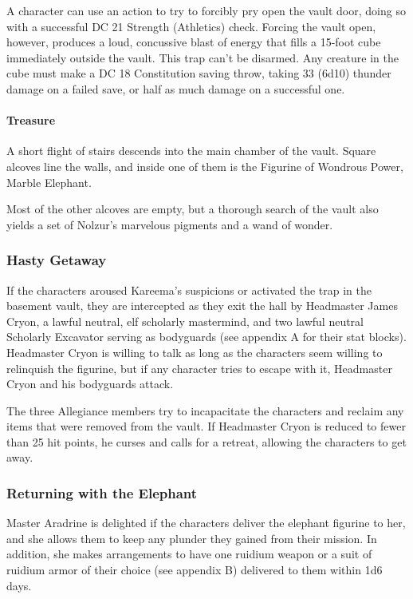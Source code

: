 \documentclass[10pt,a4paper,twoside,bg=print,twocolumn,openany,nodeprecatedcode]{dndbook}
\begin{document}
A character can use an action to try to forcibly pry open the vault door, doing so with a successful DC 21 Strength (Athletics) check. Forcing the vault open, however, produces a loud, concussive blast of energy that fills a 15-foot cube immediately outside the vault. This trap can't be disarmed. Any creature in the cube must make a DC 18 Constitution saving throw, taking 33 (6d10) thunder damage on a failed save, or half as much damage on a successful one.

\paragraph{Treasure}
A short flight of stairs descends into the main chamber of the vault. Square alcoves line the walls, and inside one of them is the Figurine of Wondrous Power, Marble Elephant.

Most of the other alcoves are empty, but a thorough search of the vault also yields a set of Nolzur's marvelous pigments and a wand of wonder.

\subsubsection{Hasty Getaway}
If the characters aroused Kareema's suspicions or activated the trap in the basement vault, they are intercepted as they exit the hall by Headmaster James Cryon, a lawful neutral, elf scholarly mastermind, and two lawful neutral Scholarly Excavator serving as bodyguards (see appendix A for their stat blocks). Headmaster Cryon is willing to talk as long as the characters seem willing to relinquish the figurine, but if any character tries to escape with it, Headmaster Cryon and his bodyguards attack.

The three Allegiance members try to incapacitate the characters and reclaim any items that were removed from the vault. If Headmaster Cryon is reduced to fewer than 25 hit points, he curses and calls for a retreat, allowing the characters to get away.

\subsubsection{Returning with the Elephant}
Master Aradrine is delighted if the characters deliver the elephant figurine to her, and she allows them to keep any plunder they gained from their mission. In addition, she makes arrangements to have one ruidium weapon or a suit of ruidium armor of their choice (see appendix B) delivered to them within 1d6 days.
\end{document}
